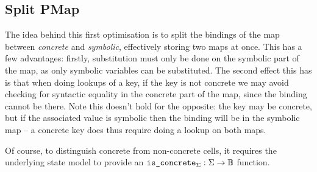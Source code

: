 \subsection{Split PMap}

The idea behind this first optimisation is to split the bindings of the map between \emph{concrete} and \emph{symbolic}, effectively storing two maps at once. This has a few advantages: firstly, substitution must only be done on the symbolic part of the map, as only symbolic variables can be substituted. The second effect this has is that when doing lookups of a key, if the key is not concrete we may avoid checking for syntactic equality in the concrete part of the map, since the binding cannot be there. Note this doesn't hold for the opposite: the key may be concrete, but if the associated value is symbolic then the binding will be in the symbolic map -- a concrete key does thus require doing a lookup on both maps.

Of course, to distinguish concrete from non-concrete cells, it requires the underlying state model to provide an $\texttt{is\_concrete}_\Sigma: \Sigma\rightarrow \mathbb{B}$ function.

